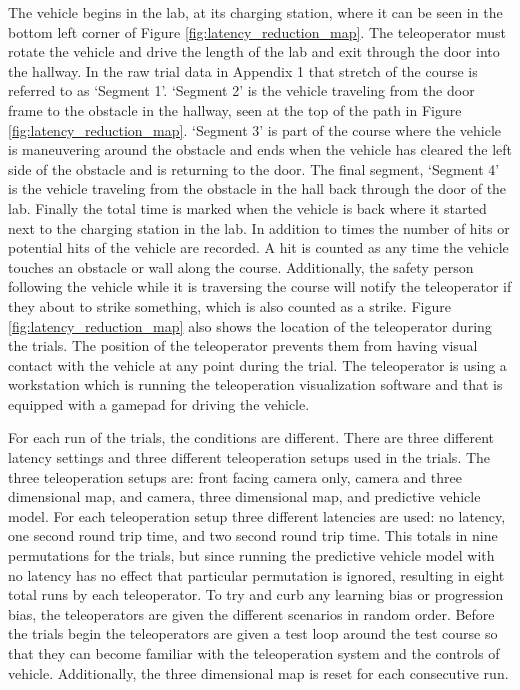 \documentclass[12pt]{report}
\begin{document}
The vehicle begins in the lab, at its charging station, where it can be seen in the bottom left corner of Figure \ref{fig:latency_reduction_map}.  The teleoperator must rotate the vehicle and drive the length of the lab and exit through the door into the hallway.  In the raw trial data in Appendix 1 that stretch of the course is referred to as `Segment 1'.  `Segment 2' is the vehicle traveling from the door frame to the obstacle in the hallway, seen at the top of the path in Figure \ref{fig:latency_reduction_map}.  `Segment 3' is part of the course where the vehicle is maneuvering around the obstacle and ends when the vehicle has cleared the left side of the obstacle and is returning to the door.  The final segment, `Segment 4' is the vehicle traveling from the obstacle in the hall back through the door of the lab.  Finally the total time is marked when the vehicle is back where it started next to the charging station in the lab.  In addition to times the number of hits or potential hits of the vehicle are recorded.  A hit is counted as any time the vehicle touches an obstacle or wall along the course.  Additionally, the safety person following the vehicle while it is traversing the course will notify the teleoperator if they about to strike something, which is also counted as a strike.  Figure \ref{fig:latency_reduction_map} also shows the location of the teleoperator during the trials.  The position of the teleoperator prevents them from having visual contact with the vehicle at any point during the trial.  The teleoperator is using a workstation which is running the teleoperation visualization software and that is equipped with a gamepad for driving the vehicle.  

For each run of the trials, the conditions are different.  There are three different latency settings and three different teleoperation setups used in the trials.  The three teleoperation setups are: front facing camera only, camera and three dimensional map, and camera, three dimensional map, and predictive vehicle model.  For each teleoperation setup three different latencies are used: no latency, one second round trip time, and two second round trip time.  This totals in nine permutations for the trials, but since running the predictive vehicle model with no latency has no effect that particular permutation is ignored, resulting in eight total runs by each teleoperator.  To try and curb any learning bias or progression bias, the teleoperators are given the different scenarios in random order.  Before the trials begin the teleoperators are given a test loop around the test course so that they can become familiar with the teleoperation system and the controls of vehicle.  Additionally, the three dimensional map is reset for each consecutive run.
\end{document}
